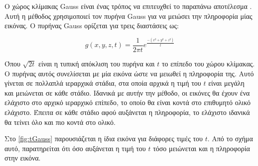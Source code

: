 \documentclass[a4paper,12pt]{article}
\begin{document}
Ο χώρος κλίμακας Gauss είναι ένας τρόπος να επιτευχθεί το παραπάνω αποτέλεσμα
\cite{scale_space:1}. Αυτή η μέθοδος χρησιμοποιεί τον πυρήνα Gauss για να
μειώσει την πληροφορία μίας εικόνας. Ο πυρήνας Gauss ορίζεται για τρεις
διαστάσεις ως:

\begin{equation} \label{gaussian_kernel:1}
    g(x,y,z,t) = \frac{1} {2 \pi t} e^{\frac{-(x^2 + y^2 + z^2) }{t}}
\end{equation}

Όπου $\sqrt{2t}$ είναι η τυπική απόκλιση του πυρήνα και $t$ το επίπεδο του χώρου
κλίμακας. Ο πυρήνας αυτός συνελίσεται με μία εικόνα ώστε να μειωθεί η πληροφορία
της. Αυτό γίνεται σε πολλαπλά ιεραρχικά στάδια, στα οποία αρχικά η τιμή του $t$
είναι μεγάλη και μειώνεται σε κάθε στάδιο. Ιδανικά με αυτήν την μέθοδο, οι
εικόνες θα έχουν ένα ελάχιστο στο αρχικό ιεραρχικό επίπεδο, το οποίο θα είναι
κοντά στο επιθυμητό ολικό ελάχιστο. Έπειτα σε κάθε στάδιο αφού αυξάνεται η
πληροφορία, το ελάχιστο ιδανικά θα τείνει όλο και πιο κοντά στο ολικό.

Στο \autoref{fig:tGauss} παρουσιάζεται η ίδια εικόνα για διάφορες τιμές του $t$.
Από το σχήμα αυτό, παρατηρείται ότι όσο αυξάνεται η τιμή του $t$ τόσο μειώνεται
και η πληροφορία στην εικόνα.
\end{document}
